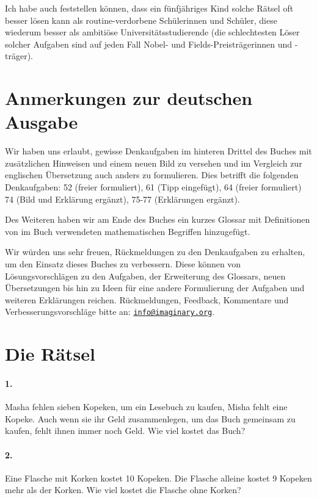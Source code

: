 \documentclass[10pt,a5paper,twoside]{article}
\newenvironment{problem}[1]{\paragraph*{#1}}{}
\begin{document}
Ich habe auch feststellen können, dass ein fünfjähriges Kind solche Rätsel oft besser lösen kann als routine-verdorbene Schülerinnen und Schüler, diese wiederum besser als ambitiöse Universitätsstudierende (die schlechtesten Löser solcher Aufgaben sind auf jeden Fall Nobel- und Fields-Preisträgerinnen und -träger).

\clearpage
\section*{Anmerkungen zur deutschen Ausgabe}
Wir haben uns erlaubt, gewisse Denkaufgaben im hinteren Drittel des Buches mit zusätzlichen Hinweisen und einem neuen Bild zu versehen und im Vergleich zur englischen Übersetzung auch anders zu formulieren. Dies betrifft die folgenden Denkaufgaben:
52 (freier formuliert), 61 (Tipp eingefügt), 64 (freier formuliert) 74 (Bild und Erklärung ergänzt), 75-77 (Erklärungen ergänzt).

Des Weiteren haben wir am Ende des Buches ein kurzes Glossar mit Definitionen von im Buch verwendeten mathematischen Begriffen hinzugefügt.

Wir würden uns sehr freuen, Rückmeldungen zu den Denkaufgaben zu erhalten, um den Einsatz dieses Buches zu verbessern. Diese können von Lösungsvorschlägen zu den Aufgaben, der Erweiterung des Glossars, neuen Übersetzungen bis hin zu Ideen für eine andere Formulierung der Aufgaben und weiteren Erklärungen reichen. Rückmeldungen, Feedback, Kommentare und Verbesserungsvorschläge bitte an:
\href{mailto:info@imaginary.org}{\nolinkurl{info@imaginary.org}}.

\clearpage
\section*{Die Rätsel}

%
%

%
\begin{problem}{1.}
	Masha fehlen sieben Kopeken, um ein Lesebuch zu kaufen, Misha fehlt eine Kopeke. Auch wenn sie ihr Geld zusammenlegen, um das Buch gemeinsam zu kaufen, fehlt ihnen immer noch Geld. Wie viel kostet das Buch?
\end{problem}

\begin{problem}{2.}
	Eine Flasche mit Korken kostet 10 Kopeken. Die Flasche alleine kostet 9 Kopeken mehr als der Korken. Wie viel kostet die Flasche ohne Korken?
\end{problem}
\end{document}
